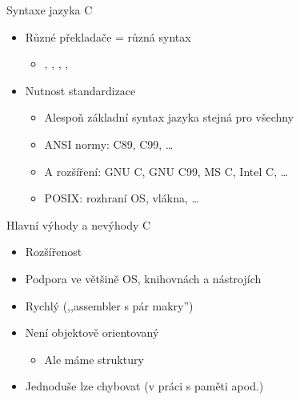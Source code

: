\begin{frame}{Syntaxe jazyka C}

  \begin{itemize}
    \item Různé překladače = různá syntax
    \begin{itemize}
      \item {}, , , ,
    \end{itemize}

    \pause

    \item Nutnost standardizace
    \begin{itemize}
      \item Alespoň základní syntax jazyka stejná pro všechny

      \pause

      \item ANSI normy: C89, C99, \dots
      \item A rozšíření: GNU C, GNU C99, MS C, Intel C, \dots

      \pause

      \item POSIX: rozhraní OS, vlákna, \dots
    \end{itemize}
  \end{itemize}

\end{frame}

\begin{frame}{Hlavní výhody a nevýhody C}

  \begin{itemize}
    \item Rozšířenost
    \item Podpora ve většině OS, knihovnách a nástrojích

    \pause

    \item Rychlý (,,assembler s pár makry'')
  \end{itemize}

  \pause
  \medskip

  \begin{itemize}
    \item Není objektově orientovaný
    \begin{itemize}
      \item Ale máme struktury
    \end{itemize}

    \pause

    \item Jednoduše lze chybovat (v práci s paměti apod.)
  \end{itemize}

\end{frame}

